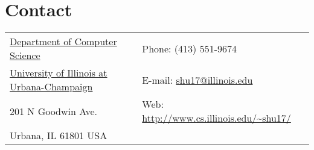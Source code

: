 \section{\sc Contact}
\vspace{.05in}
\begin{tabular}{@{}p{3in}p{4in}}
{\href{http://www.cs.illinois.edu/}{Department of Computer Science}}                     & {Phone:}  (413) 551-9674 \\
{\href{http://www.illinois.edu/}{University of Illinois at Urbana-Champaign}}            & {E-mail:} {\href{mailto:shu17@illinois.edu}{shu17@illinois.edu}}\\
201 N Goodwin Ave.                                                                                 & {Web:} {\url{http://www.cs.illinois.edu/~shu17/}}\\
Urbana, IL 61801 USA
\end{tabular}



